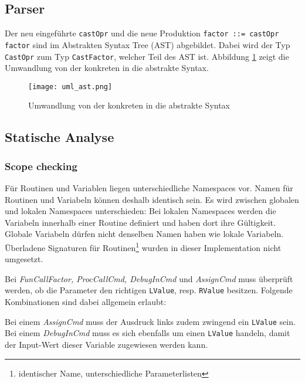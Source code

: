 \documentclass[10pt, a4paper, twocolumn]{article} %
\begin{document}
\subsection{Parser}
Der neu eingeführte \texttt{castOpr} und die neue Produktion \texttt{factor ::= castOpr factor} sind im Abstrakten Syntax Tree (AST) abgebildet.
Dabei wird der Typ \texttt{CastOpr} zum Typ \texttt{CastFactor}, welcher Teil des AST ist.
Abbildung \ref{ast} zeigt die Umwandlung von der konkreten in die abstrakte Syntax.

\begin{figure}[H]
    \texttt{[image: uml\_ast.png]} %
    \caption{Umwandlung von der konkreten in die abstrakte Syntax} %
    \label{ast}
\end{figure}

\subsection{Statische Analyse}

\subsubsection*{Scope checking}
Für Routinen und Variablen liegen unterschiedliche Namespaces vor.
Namen für Routinen und Variabeln können deshalb identisch sein.
Es wird zwischen globalen und lokalen Namespaces unterschieden: Bei lokalen Namespaces werden die Variabeln innerhalb einer Routine definiert und haben dort ihre Gültigkeit.
Globale Variabeln dürfen nicht denselben Namen haben wie lokale Variabeln.
Überladene Signaturen für Routinen\footnote{identischer Name, unterschiedliche Parameterlisten} wurden in dieser Implementation nicht umgesetzt.

Bei \textit{FunCallFactor, ProcCallCmd, DebugInCmd} und \textit{AssignCmd} muss überprüft werden, ob die Parameter den richtigen \texttt{LValue}, resp. \texttt{RValue} besitzen.
Folgende Kombinationen sind dabei allgemein erlaubt:

\begin{table}[h]
    \centering
    \tiny
    \caption{LRValue-Kombinationen}
    \label{tab:lrvalues}
\end{table}
Bei einem \textit{AssignCmd} muss der Ausdruck links zudem zwingend ein \texttt{LValue} sein.
Bei einem \textit{DebugInCmd} muss es sich ebenfalls um einen \texttt{LValue} handeln, damit der Input-Wert dieser Variable zugewiesen werden kann.
\end{document}
